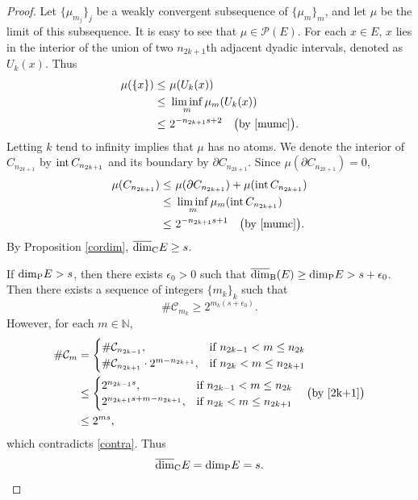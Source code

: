 \documentclass[12pt]{article}
\newcommand{\1}{{\bf 1}}
\newcommand\ucod{\overline{\mbox{\rm dim}}_{\rm C}} %
\newcommand\ubd{\overline{\mbox{\rm dim}}_{\rm B}} %
\newcommand\pkd{\mbox{\rm dim}_{\rm P}} %
\begin{document}
\begin{proof}
		Let $\{\mu_{m_j}\}_j$ be a weakly convergent subsequence of $\{\mu_m\}_m$, and let $\mu$ be the limit of this subsequence.
		It is easy to see that $\mu\in\mathcal{P}(E)$.
		For each $x\in E$, $x$ lies in the interior of the union of two ${n_{2k+1}}$th adjacent dyadic intervals, denoted as $U_k(x)$.
			Thus
		\begin{align*}
			\mu(\{x\})\leq&\ \mu(U_k(x))\\
		\leq&\ \liminf_m\mu_m(U_k(x))\\
		\leq&\  2^{-n_{2k+1}s+2}\quad\big(\text{by } \eqref{mumc}\big).
		\end{align*}	
			Letting  $k$ tend to infinity  implies that $\mu$ has no atoms.
			We denote the interior of  ${C}_{n_{2k+1}}$ by ${\rm int }\,{C}_{n_{2k+1}}$ and its boundary by  $\partial C_{n_{2k+1}}$. Since $\mu(\partial C_{n_{2k+1}})=0$, 
		\begin{align*}
			\mu(C_{n_{2k+1}})\leq&\ \mu(\partial C_{n_{2k+1}})+\mu({\rm int }\,{C}_{n_{2k+1}})\\
			\leq&\ \liminf_m\mu_{m}({\rm int }\,{C}_{n_{2k+1}})\\
			\leq&\ 2^{-n_{2k+1}s+1}\quad\big(\text{by } \eqref{mumc}\big).
		\end{align*}	
By Proposition \ref{cordim},  $\ucod E\geq s$.
		
		If $\pkd  E> s$, then there exists $\epsilon_0>0$ such that $\ubd(E)\geq\pkd E> s+\epsilon_0$.
		Then  there exists a sequence of integers $\{m_k\}_k$ such that
		\begin{equation}\label{contra}
			\#\mathcal{C}_{m_k}\geq 2^{m_k(s+\epsilon_0)}.
		\end{equation}
		However, for each $m\in\mathbb{N}$, 
			\begin{align*}
			\#\mathcal{C}_m&=\begin{cases}
				\#\mathcal{C}_{n_{2k-1}}, & \text{if } n_{2k-1}<m\leq n_{2k}\\
				\#\mathcal{C}_{n_{2k+1}}\cdot 2^{m-n_{2k+1}}, & \text{if } n_{2k}<m\leq n_{2k+1}
			\end{cases}\\
			&\leq\begin{cases}
				2^{n_{2k-1}s}, & \text{if } n_{2k-1}<m\leq n_{2k}\\
				2^{n_{2k+1}s+m-n_{2k+1}}, & \text{if } n_{2k}<m\leq n_{2k+1}
			\end{cases}\quad\big(\text{by } \eqref{2k+1}\big)\\
			&\leq 2^{ms},
		\end{align*}
		which contradicts  \eqref{contra}.
		Thus $$\ucod E= \pkd E =s.$$
	\end{proof}
\end{document}
